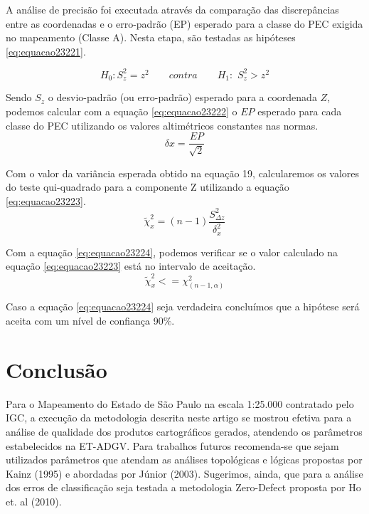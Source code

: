 \documentclass[12pt,a4paper]{article}
\begin{document}
		A análise de precisão foi executada através da comparação das discrepâncias entre as coordenadas e o erro-padrão (EP) esperado para a classe do PEC exigida no mapeamento (Classe A). Nesta etapa, são testadas as hipóteses \ref{eq:equacao23221}.
		
		\begin{equation}
		H_{0}: S^2_{z}=z^2\quad\quad contra\quad\quad
		H_{1}:\,\, S^2_{z}>z^2
		\label{eq:equacao23221}
		\end{equation}
		
		Sendo $S_{z}$ o desvio-padrão (ou erro-padrão) esperado para a coordenada $Z$, podemos calcular com a equação \ref{eq:equacao23222} o $EP$ esperado para cada classe do PEC utilizando os valores altimétricos constantes nas normas.
		\begin{equation}
		\delta x=\frac{EP}{\sqrt{2}}
		\label{eq:equacao23222}
		\end{equation}
		
		Com o valor da variância esperada obtido na equação 19, calcularemos os valores do teste qui-quadrado para a
		componente Z utilizando a equação \ref{eq:equacao23223}.
		\begin{equation}
		\tilde{\chi}^2_{x}=(n-1)\frac{S^2_{\Delta z}}{\delta^2_{x}}
		\label{eq:equacao23223}
		\end{equation}
		
		Com a equação \ref{eq:equacao23224}, podemos verificar se o valor calculado na equação \ref{eq:equacao23223} está no intervalo de aceitação.
		\begin{equation}
		\tilde{\chi}^2_{x}<={\chi}^2_{(n-1,\alpha)}
		\label{eq:equacao23224}
		\end{equation}
		
		Caso a equação \ref{eq:equacao23224} seja verdadeira concluímos que a hipótese será aceita com um nível de confiança 90$\%$.
		
		\section{Conclusão}
		Para o Mapeamento do Estado de São Paulo na escala 1:25.000 contratado pelo IGC, a execução da metodologia descrita neste artigo se mostrou efetiva para a análise de qualidade dos produtos cartográficos gerados, atendendo os parâmetros estabelecidos na ET-ADGV. Para
		trabalhos futuros recomenda-se que sejam utilizados parâmetros que atendam as análises topológicas e lógicas propostas por Kainz (1995) e abordadas por Júnior (2003). Sugerimos, ainda, que para a análise dos erros de classificação seja testada a metodologia Zero-Defect proposta por Ho et. al (2010).
		 
	
	{\small	 }
\end{document}
